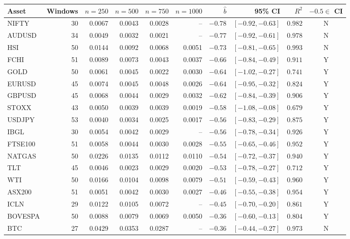\begin{tabular}{lrrrrrrrrc}
\toprule
Asset & Windows & $n{=}250$ & $n{=}500$ & $n{=}750$ & $n{=}1000$ & $\hat{b}$ & 95\% CI & $R^2$ & $-0.5 \in$ CI \\
\midrule
  NIFTY & 30 & 0.0067 & 0.0043 & 0.0028 & -- & $-0.78$ & $[-0.92, -0.63]$ & $0.982$ & N \\
  AUDUSD & 34 & 0.0049 & 0.0032 & 0.0021 & -- & $-0.77$ & $[-0.92, -0.61]$ & $0.978$ & N \\
  HSI & 50 & 0.0144 & 0.0092 & 0.0068 & 0.0051 & $-0.73$ & $[-0.81, -0.65]$ & $0.993$ & N \\
  FCHI & 51 & 0.0089 & 0.0073 & 0.0043 & 0.0037 & $-0.66$ & $[-0.84, -0.49]$ & $0.911$ & Y \\
  GOLD & 50 & 0.0061 & 0.0045 & 0.0022 & 0.0030 & $-0.64$ & $[-1.02, -0.27]$ & $0.741$ & Y \\
  EURUSD & 45 & 0.0074 & 0.0045 & 0.0048 & 0.0026 & $-0.64$ & $[-0.95, -0.32]$ & $0.824$ & Y \\
  GBPUSD & 45 & 0.0068 & 0.0044 & 0.0029 & 0.0032 & $-0.62$ & $[-0.84, -0.39]$ & $0.906$ & Y \\
  STOXX & 43 & 0.0050 & 0.0039 & 0.0039 & 0.0019 & $-0.58$ & $[-1.08, -0.08]$ & $0.679$ & Y \\
  USDJPY & 53 & 0.0040 & 0.0034 & 0.0025 & 0.0017 & $-0.56$ & $[-0.83, -0.29]$ & $0.875$ & Y \\
  IBGL & 30 & 0.0054 & 0.0042 & 0.0029 & -- & $-0.56$ & $[-0.78, -0.34]$ & $0.926$ & Y \\
  FTSE100 & 51 & 0.0058 & 0.0044 & 0.0030 & 0.0028 & $-0.55$ & $[-0.65, -0.46]$ & $0.952$ & Y \\
  NATGAS & 50 & 0.0226 & 0.0135 & 0.0112 & 0.0110 & $-0.54$ & $[-0.72, -0.37]$ & $0.940$ & Y \\
  TLT & 45 & 0.0046 & 0.0023 & 0.0029 & 0.0020 & $-0.53$ & $[-0.78, -0.27]$ & $0.712$ & Y \\
  WTI & 50 & 0.0166 & 0.0104 & 0.0098 & 0.0079 & $-0.51$ & $[-0.59, -0.43]$ & $0.960$ & Y \\
  ASX200 & 51 & 0.0051 & 0.0042 & 0.0030 & 0.0027 & $-0.46$ & $[-0.55, -0.38]$ & $0.954$ & Y \\
  ICLN & 29 & 0.0122 & 0.0105 & 0.0072 & -- & $-0.45$ & $[-0.70, -0.20]$ & $0.861$ & Y \\
  BOVESPA & 50 & 0.0088 & 0.0079 & 0.0069 & 0.0050 & $-0.36$ & $[-0.60, -0.13]$ & $0.804$ & Y \\
  BTC & 27 & 0.0429 & 0.0353 & 0.0287 & -- & $-0.36$ & $[-0.44, -0.27]$ & $0.973$ & N \\

\end{tabular}
